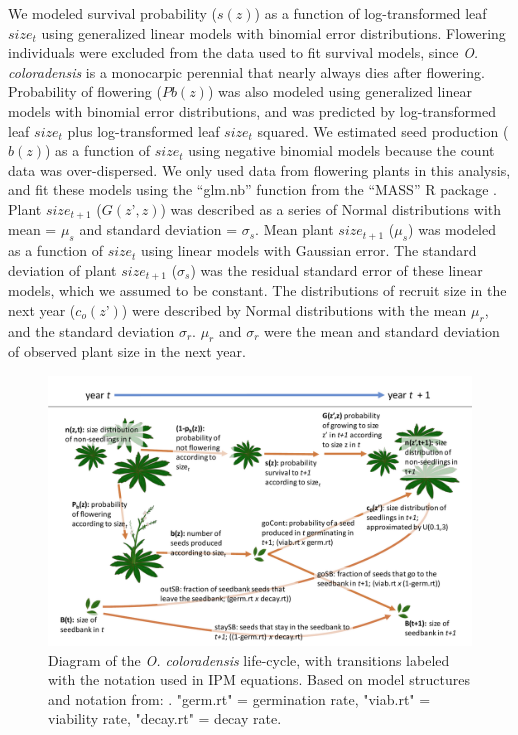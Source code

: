 \documentclass[12pt, letterpaper]{article}
\begin{document}
We modeled survival probability ($s(z)$) as a function of log-transformed leaf $size_t$ using generalized linear models with binomial error distributions. Flowering individuals were excluded from the data used to fit survival models, since \textit{O. coloradensis} is a monocarpic perennial that nearly always dies after flowering. Probability of flowering ($Pb(z)$) was also modeled using generalized linear models with binomial error distributions, and was predicted by log-transformed leaf $size_t$ plus log-transformed leaf $size_t$ squared. We estimated seed production ($b(z)$) as a function of $size_t$ using negative binomial models because the count data was over-dispersed. We only used data from flowering plants in this analysis, and fit these models using the “glm.nb” function from the “MASS” R package \cite{Venables2002ModernS}. Plant $size_{t+1}$ ($G(z’,z)$) was described as a series of Normal distributions with mean = $\mu_s$ and standard deviation = $\sigma_s$. Mean plant $size_{t+1}$ ($\mu_s$) was modeled as a function of $size_t$ using linear models with Gaussian error. The standard deviation of plant $size_{t+1}$ ($\sigma_s$) was the residual standard error of these linear models, which we assumed to be constant. The distributions of recruit size in the next year ($c_o(z’)$) were described by Normal distributions with the mean $\mu_r$, and the standard deviation $\sigma_r$. $\mu_r$ and $\sigma_r$ were the mean and standard deviation of observed plant size in the next year. 

\begin{figure}[h]
    \centering
    \includegraphics[width=1\textwidth]{COBP_lifecyclediagram_new.pdf}
    \caption{Diagram of the \textit{O. coloradensis} life-cycle, with transitions labeled with the notation used in IPM equations. Based on model structures and notation from: \cite{Paniw2017, Merow2014AdvancingGuide, Ellner2016Data-drivenPopulations}. "germ.rt" = germination rate, "viab.rt" = viability rate, "decay.rt" = decay rate.}
    \label{fig:lifecycle}
\end{figure}
\end{document}
